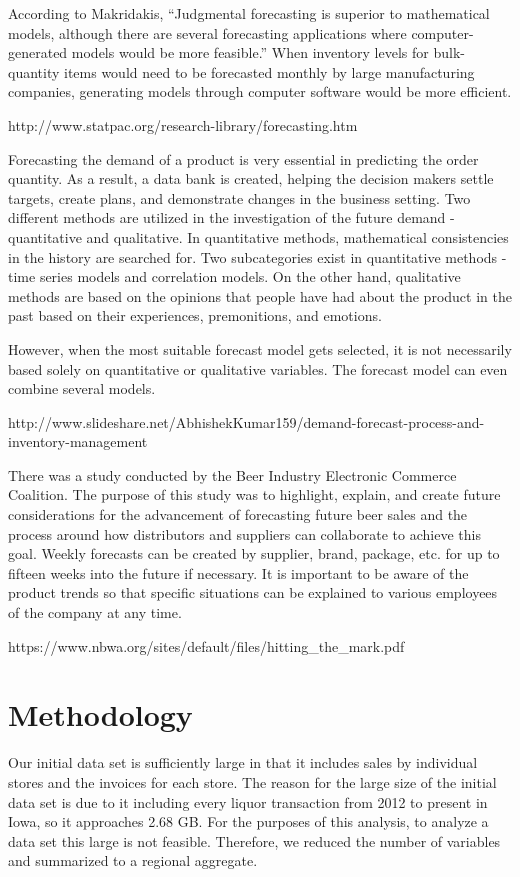 \documentclass[]{elsarticle} %
\begin{document}
According to Makridakis, ``Judgmental forecasting is superior to
mathematical models, although there are several forecasting applications
where computer-generated models would be more feasible.'' When inventory
levels for bulk-quantity items would need to be forecasted monthly by
large manufacturing companies, generating models through computer
software would be more efficient.

http://www.statpac.org/research-library/forecasting.htm

Forecasting the demand of a product is very essential in predicting the
order quantity. As a result, a data bank is created, helping the
decision makers settle targets, create plans, and demonstrate changes in
the business setting. Two different methods are utilized in the
investigation of the future demand - quantitative and qualitative. In
quantitative methods, mathematical consistencies in the history are
searched for. Two subcategories exist in quantitative methods - time
series models and correlation models. On the other hand, qualitative
methods are based on the opinions that people have had about the product
in the past based on their experiences, premonitions, and emotions.

However, when the most suitable forecast model gets selected, it is not
necessarily based solely on quantitative or qualitative variables. The
forecast model can even combine several models.

http://www.slideshare.net/AbhishekKumar159/demand-forecast-process-and-inventory-management

There was a study conducted by the Beer Industry Electronic Commerce
Coalition. The purpose of this study was to highlight, explain, and
create future considerations for the advancement of forecasting future
beer sales and the process around how distributors and suppliers can
collaborate to achieve this goal. Weekly forecasts can be created by
supplier, brand, package, etc. for up to fifteen weeks into the future
if necessary. It is important to be aware of the product trends so that
specific situations can be explained to various employees of the company
at any time.

https://www.nbwa.org/sites/default/files/hitting\_the\_mark.pdf

\section{Methodology}\label{methodology}

Our initial data set is sufficiently large in that it includes sales by
individual stores and the invoices for each store. The reason for the
large size of the initial data set is due to it including every liquor
transaction from 2012 to present in Iowa, so it approaches 2.68 GB. For
the purposes of this analysis, to analyze a data set this large is not
feasible. Therefore, we reduced the number of variables and summarized
to a regional aggregate.
\end{document}
